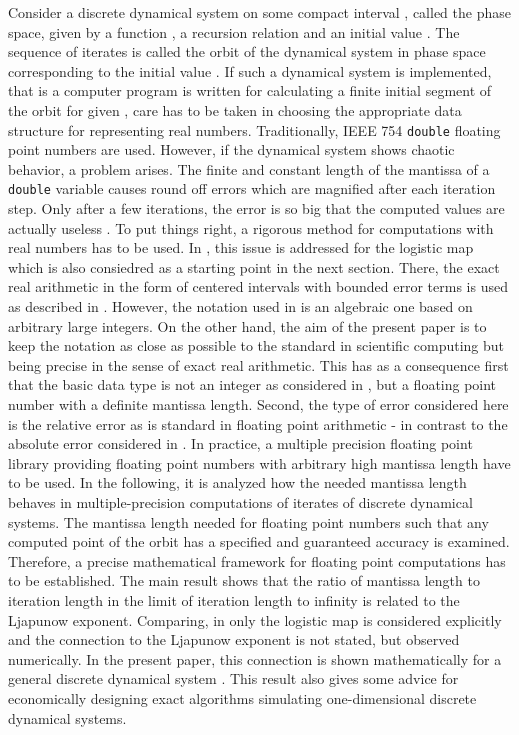 \documentclass[copyright,creativecommons]{eptcs}
\theoremstyle{definition}
\begin{document}
Consider a discrete dynamical system  on some compact interval ,
called the phase space, given by a function , a recursion relation
 and an initial value . The sequence  of
iterates is called the orbit of the dynamical system in phase space corresponding
to the initial value . If such a dynamical system is implemented, that is
a computer program is written for calculating a finite initial
segment of the orbit for given , care has to be taken in choosing
the appropriate data structure for representing real numbers. Traditionally,
IEEE 754 {\tt double} floating point numbers \cite{ieee87} are used. However,
if the dynamical system shows chaotic behavior, a problem arises. The finite
and constant length of the mantissa of a {\tt double} variable causes round
off errors which are magnified after each iteration step. Only after a few
iterations, the error is so big that the computed values are actually
useless \cite{Mue01}. To put things right, a rigorous method for computations
with real numbers has to be used. In \cite{Bla05}, this issue is addressed
for the logistic map which is also consiedred as a starting point in the next
section. There, the exact real arithmetic in the form of centered intervals
with bounded error terms is used as described in \cite{bl06}. However, the
notation used in \cite{Bla05, bl06} is an algebraic one based on arbitrary
large integers. On the other hand, the aim of the present paper is to keep
the notation as close as possible to the standard in scientific computing
but being precise in the sense of exact real arithmetic. This has as a
consequence first that the basic data type is not an integer as considered
in \cite{Bla05, bl06}, but a floating point number with a definite
mantissa length. Second, the type of error considered here is the
relative error as is standard in floating point arithmetic - in contrast
to the absolute error considered in \cite{Bla05, bl06}. In practice, a
multiple precision floating point library providing floating point
numbers with arbitrary high mantissa length have to be used.
In the following, it is analyzed how the needed
mantissa length behaves in multiple-precision computations of
iterates of discrete dynamical systems. The mantissa length needed
for floating point numbers such that any computed point of the orbit
has a specified and guaranteed accuracy is examined. Therefore,
a precise mathematical framework for floating point computations
has to be established. The main result shows that the
ratio of mantissa length to iteration length in the limit of
iteration length to infinity is related to the Ljapunow exponent.
Comparing, in \cite{Bla05} only the logistic map is
considered explicitly and the connection to the Ljapunow exponent
is not stated, but observed numerically. In the present paper,
this connection is shown mathematically for a general discrete
dynamical system .
This result also gives some advice for economically designing exact
algorithms simulating one-dimensional discrete dynamical systems.
\end{document}
